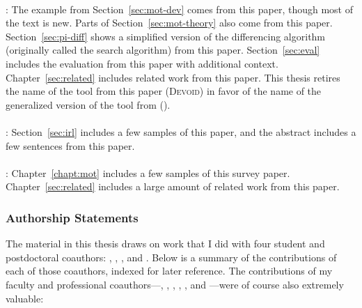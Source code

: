 \paragraph{}\hspace{-0.6cm}
:
The example from Section~\ref{sec:mot-dev} comes from this paper, though most of the text is new.
Parts of Section~\ref{sec:mot-theory} also come from this paper.
Section~\ref{sec:pi-diff} shows a simplified version of the differencing algorithm (originally called the search algorithm) from this paper.
Section~\ref{sec:eval} includes the evaluation from this paper with additional context.
Chapter~\ref{sec:related} includes related work from this paper.
This thesis retires the name of the tool from this paper (\textsc{Devoid})
in favor of the name of the generalized version of the tool from  (\toolnamec).

\paragraph{}\hspace{-0.6cm}
:
Section~\ref{sec:irl} includes a few samples of this paper,
and the abstract includes a few sentences from this paper.

\paragraph{}\hspace{-0.6cm}
:
Chapter~\ref{chapt:mot} includes a few samples of this survey paper.
Chapter~\ref{sec:related} includes a large amount of related work from this paper.

\subsubsection*{Authorship Statements}

The material in this thesis draws on work that I did with
four student and postdoctoral coauthors: , , ,
and .
Below is a summary of the contributions of each of those coauthors,
indexed for later reference.
The contributions of my faculty and professional coauthors---, , ,
, , and ---were of course also extremely valuable:

